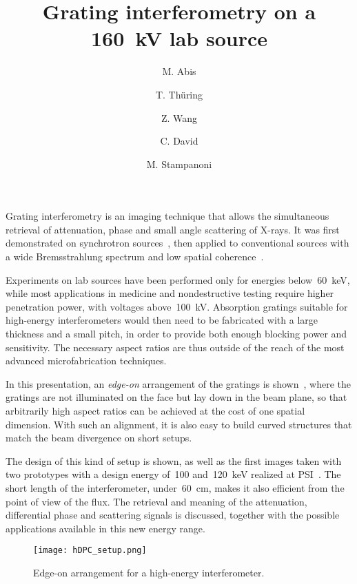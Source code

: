 \documentclass[a4paper]{article}
\begin{document}
\title{Grating interferometry on a \SI{160}{\kilo\volt} lab source}
\author[1,2]{M. Abis}
\author[1,2]{T. Th\"uring}
\author[2]{Z. Wang}
\author[2]{C. David}
\author[1,2]{M. Stampanoni}
\renewcommand{\today}{}
\maketitle
\thispagestyle{empty}

Grating interferometry is an imaging technique that allows the simultaneous
retrieval of attenuation, phase and small angle scattering of X-rays.
It was first demonstrated on synchrotron sources~\cite{David2002}, then
applied to conventional sources with a wide Bremsstrahlung spectrum and low
spatial coherence~\cite{Pfeiffer2006}.

Experiments on lab sources have been performed only for energies
below~\SI{60}{\kilo\eV}, while most applications in medicine and
nondestructive testing require higher penetration power, with voltages
above~\SI{100}{\kilo\V}.
Absorption gratings suitable for high-energy interferometers would then need to be
fabricated with a large thickness and a small pitch, in order to provide
both enough blocking power and sensitivity. The necessary aspect
ratios are thus outside of the reach of the most advanced
microfabrication techniques.

In this presentation, an \emph{edge-on} arrangement of the gratings is
shown~\cite{david2014method}, where the gratings are not illuminated on the face but lay down in
the beam plane, so that arbitrarily high aspect ratios can be achieved at
the cost of one spatial dimension. With such an alignment, it is also easy
to build curved structures that match the beam divergence on short setups.

The design of this kind of setup is shown, as well as the first images taken
with two prototypes with a design energy of~\num{100}
and~\SI{120}{\kilo\eV} realized at PSI~\cite{Thuering2014b}. The short length of the
interferometer, under~\SI{60}{\centi\metre}, makes it also efficient from
the point of view of the flux. The retrieval and meaning of the attenuation,
differential phase and scattering signals is discussed, together with the
possible applications available in this new energy range.

\begin{figure}[h!]
    \centering
    \texttt{[image: hDPC\_setup.png]}
    \caption*{Edge-on arrangement for a high-energy interferometer.}\label{fig:edgeon}
\end{figure}
\printbibliography
\end{document}
